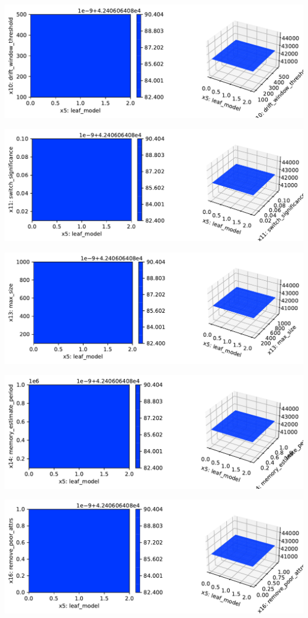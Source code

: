 \documentclass[
  letterpaper,
  DIV=11,
  numbers=noendperiod]{scrreprt}
\begin{document}
\includegraphics{024_spot_hpt_river_friedman_hatr_files/figure-pdf/cell-42-output-65.pdf}

\includegraphics{024_spot_hpt_river_friedman_hatr_files/figure-pdf/cell-42-output-66.pdf}

\includegraphics{024_spot_hpt_river_friedman_hatr_files/figure-pdf/cell-42-output-67.pdf}

\includegraphics{024_spot_hpt_river_friedman_hatr_files/figure-pdf/cell-42-output-68.pdf}

\includegraphics{024_spot_hpt_river_friedman_hatr_files/figure-pdf/cell-42-output-69.pdf}
\end{document}
